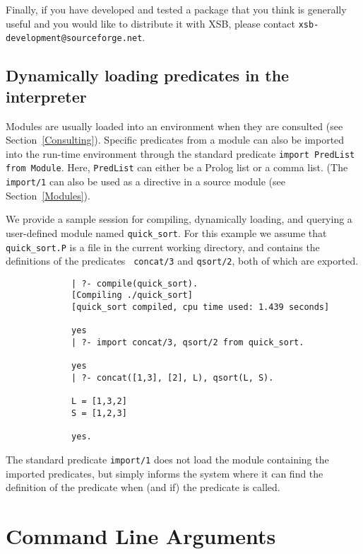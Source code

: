Finally, if you have developed and tested a package that you think is
generally useful and you would like to distribute it with XSB, please
contact {\tt xsb-development@sourceforge.net}.


\subsection{Dynamically loading predicates in the interpreter}
Modules are usually loaded into an environment when they are consulted
(see Section~\ref{Consulting}).  Specific predicates from a module can
also be imported into the run-time environment through the standard
predicate {\tt import PredList from Module}.
Here, {\tt PredList} can either be a Prolog list or a comma list.
(The {\tt import/1} can also be used as a directive in a source module
(see Section~\ref{Modules}). 

We provide a sample session for compiling, dynamically loading, and
querying a user-defined module named {\tt quick\_sort}.  For this
example we assume that {\tt quick\_sort.P} is a file in the current
working directory, and contains the definitions of the predicates {\tt
concat/3} and {\tt qsort/2}, both of which are exported.

{\footnotesize
\begin{verbatim}
             | ?- compile(quick_sort).
             [Compiling ./quick_sort]
             [quick_sort compiled, cpu time used: 1.439 seconds]

             yes
             | ?- import concat/3, qsort/2 from quick_sort. 

             yes
             | ?- concat([1,3], [2], L), qsort(L, S).

             L = [1,3,2]
             S = [1,2,3]

             yes.
\end{verbatim}
}

The standard predicate {\tt import/1} does not load the module 
containing the imported predicates, but simply informs the system 
where it can find the definition of the predicate when (and if) the
predicate is called.


\section{Command Line Arguments} \label{sec:EmuOptions}

